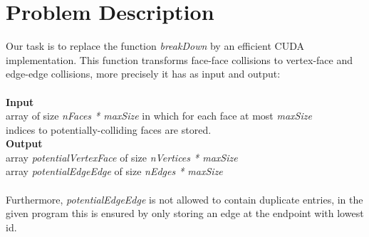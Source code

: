 \section{Problem Description}
Our task is to replace the function \textit{breakDown} by an efficient CUDA implementation. This function transforms face-face collisions to vertex-face and edge-edge collisions, more precisely it has as input and output:\\
\\
\indent \indent \textbf{Input}\\ 
\indent \indent array of size \textit{nFaces * maxSize} in which for each face at most \textit{maxSize}\\
\indent \indent indices to potentially-colliding faces are stored.\\
\indent \indent \textbf{Output}\\
\indent \indent array \textit{potentialVertexFace} of size \textit{nVertices * maxSize}\\
\indent \indent array \textit{potentialEdgeEdge} of size \textit{nEdges * maxSize}\\
\\
Furthermore, \textit{potentialEdgeEdge} is not allowed to contain duplicate entries, in the given program this is ensured by only storing an edge at the endpoint with lowest id. 
